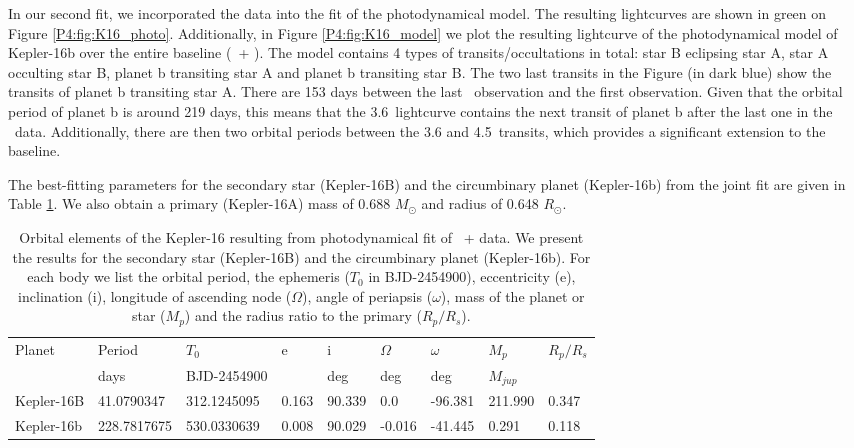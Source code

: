 In our second fit, we incorporated the \spitzer data into the fit of the photodynamical model. The resulting lightcurves are shown in green on Figure \ref{P4:fig:K16_photo}. Additionally, in Figure \ref{P4:fig:K16_model} we plot the resulting lightcurve of the photodynamical model of Kepler-16b over the entire baseline (\Kepler~+ \spitzer). The model contains 4 types of transits/occultations in total: star B eclipsing star A, star A occulting star B, planet b transiting star A and planet b transiting star B. The two last transits in the Figure (in dark blue) show the \spitzer transits of planet b transiting star A. There are 153 days between the last \Kepler~observation and the first \spitzer observation. Given that the orbital period of planet b is around 219 days, this means that the 3.6\um~\spitzer lightcurve contains the next transit of planet b after the last one in the \Kepler~data. Additionally, there are then two orbital periods between the 3.6 and 4.5\um~\spitzer transits, which provides a significant extension to the baseline.

The best-fitting parameters for the secondary star (Kepler-16B) and the circumbinary planet (Kepler-16b) from the joint fit are given in Table \ref{P4:tab:photodynamicresults}. We also obtain a primary (Kepler-16A) mass of 0.688 $M_\odot$ and radius of 0.648 $R_\odot$.

\begin{table}  \setlength{\tabcolsep}{2pt}

    \centering

    \caption{Orbital elements of the Kepler-16 resulting from photodynamical fit of \Kepler~+ \spitzer data. We present the results for the secondary star (Kepler-16B) and the circumbinary planet (Kepler-16b). For each body we list the orbital period, the ephemeris ($T_0$ in BJD-2454900), eccentricity (e), inclination (i), longitude of ascending node ($\Omega$), angle of periapsis ($\omega$), mass of the planet or star ($M_p$) and the radius ratio to the primary ($R_p/R_s$).}
    \label{P4:tab:photodynamicresults}
    \begin{tabular}{lllllllll}
\hline\hline
Planet & Period  & $T_0$ & e & i & $\Omega$ & $\omega$ & $M_p$ & $R_p/R_s$    \\
       & days & BJD-2454900 & & deg & deg & deg & $M_{jup}$ & \\
\hline
Kepler-16B	& 41.0790347 & 312.1245095 & 0.163 & 90.339	& 0.0	& -96.381	& 211.990	& 0.347  \\
Kepler-16b & 228.7817675 & 530.0330639 & 0.008 & 90.029 & -0.016 & -41.445 & 0.291 & 0.118  \\
\hline
    \end{tabular}

\end{table}



